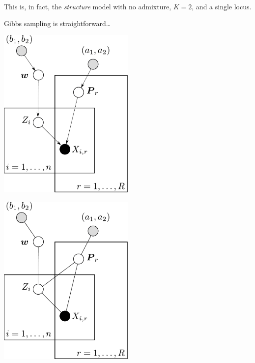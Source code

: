 This is, in fact, the {\em structure} model with no admixture, $K=2$, and a single locus.

Gibbs sampling is straightforward\ldots\hfill{}





\begin{center}
\includegraphics[width=0.5\textwidth]{figures/haploid-mixture.pdf}
\end{center}



\begin{center}
\includegraphics[width=0.5\textwidth]{figures/haploid-mixture-UG.pdf}
\end{center}



